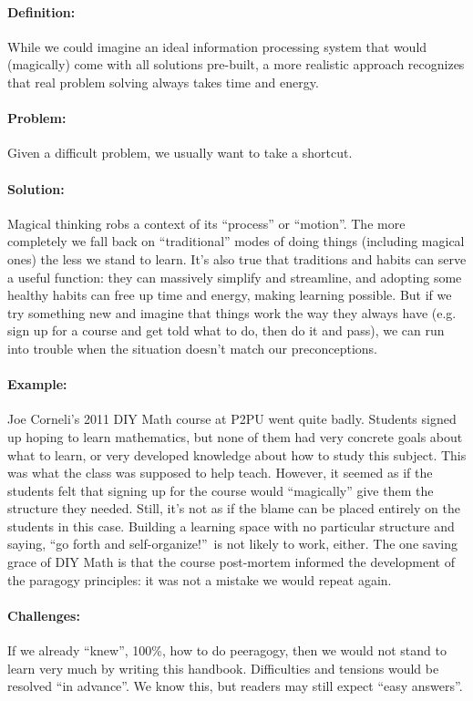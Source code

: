 \paragraph{Definition:} While we could imagine an ideal information
processing system that would (magically) come with all solutions
pre-built, a more realistic approach recognizes that real problem
solving always takes time and energy.

\paragraph{Problem:} Given a difficult problem, we usually want to take a
shortcut.

\paragraph{Solution:} Magical thinking robs a context of its ``process'' or
``motion''. The more completely we fall back on ``traditional'' modes of
doing things (including magical ones) the less we stand to learn. It's
also true that traditions and habits can serve a useful function: they
can massively simplify and streamline, and adopting some healthy habits
can free up time and energy, making learning possible. But if we try
something new and imagine that things work the way they always have
(e.g. sign up for a course and get told what to do, then do it and
pass), we can run into trouble when the situation doesn't match our
preconceptions.

\paragraph{Example:} Joe Corneli's 2011 DIY Math course at P2PU went quite
badly. Students signed up hoping to learn mathematics, but none of them
had very concrete goals about what to learn, or very developed knowledge
about how to study this subject. This was what the class was supposed to
help teach. However, it seemed as if the students felt that signing up
for the course would ``magically'' give them the structure they needed.
Still, it's not as if the blame can be placed entirely on the students
in this case. Building a learning space with no particular structure and
saying, ``go forth and self-organize!''~is not likely to work, either.
The one saving grace of DIY Math is that the course post-mortem informed
the development of the paragogy principles: it was not a mistake we
would repeat again.

\paragraph{Challenges:} If we already ``knew'', 100\%, how to do peeragogy,
then we would not stand to learn very much by writing this handbook.
Difficulties and tensions would be resolved ``in advance''. We know
this, but readers may still expect ``easy answers''.

